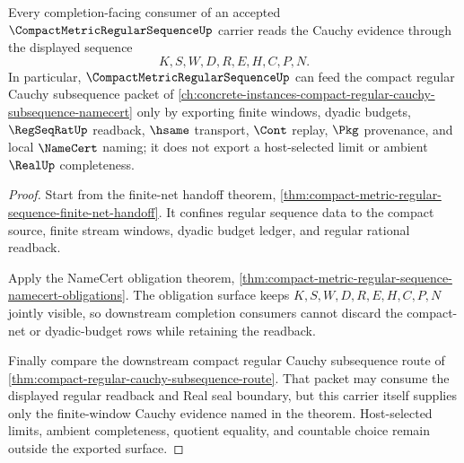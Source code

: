 \begin{theorem}
\label{thm:compact-metric-regular-sequence-cauchy-readback}
Every completion-facing consumer of an accepted $\CompactMetricRegularSequenceUp$ carrier reads the Cauchy evidence through the displayed sequence
$$
K,S,W,D,R,E,H,C,P,N .
$$
In particular, $\CompactMetricRegularSequenceUp$ can feed the compact regular Cauchy subsequence packet of \autoref{ch:concrete-instances-compact-regular-cauchy-subsequence-namecert} only by exporting finite windows, dyadic budgets, $\RegSeqRatUp$ readback, $\hsame$ transport, $\Cont$ replay, $\Pkg$ provenance, and local $\NameCert$ naming; it does not export a host-selected limit or ambient $\RealUp$ completeness.
\end{theorem}
\begin{proof}
Start from the finite-net handoff theorem, \autoref{thm:compact-metric-regular-sequence-finite-net-handoff}. It confines regular sequence data to the compact source, finite stream windows, dyadic budget ledger, and regular rational readback.

Apply the NameCert obligation theorem, \autoref{thm:compact-metric-regular-sequence-namecert-obligations}. The obligation surface keeps $K,S,W,D,R,E,H,C,P,N$ jointly visible, so downstream completion consumers cannot discard the compact-net or dyadic-budget rows while retaining the readback.

Finally compare the downstream compact regular Cauchy subsequence route of \autoref{thm:compact-regular-cauchy-subsequence-route}. That packet may consume the displayed regular readback and Real seal boundary, but this carrier itself supplies only the finite-window Cauchy evidence named in the theorem. Host-selected limits, ambient completeness, quotient equality, and countable choice remain outside the exported surface.
\end{proof}



